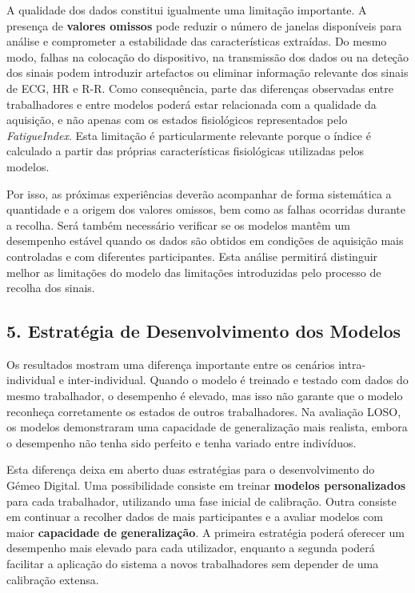 A qualidade dos dados constitui igualmente uma limitação importante. A presença de \textbf{valores omissos} pode reduzir o número de janelas disponíveis para análise e comprometer a estabilidade das características extraídas. Do mesmo modo, falhas na colocação do dispositivo, na transmissão dos dados ou na deteção dos sinais podem introduzir artefactos ou eliminar informação relevante dos sinais de ECG, HR e R-R. Como consequência, parte das diferenças observadas entre trabalhadores e entre modelos poderá estar relacionada com a qualidade da aquisição, e não apenas com os estados fisiológicos representados pelo \textit{FatigueIndex}. Esta limitação é particularmente relevante porque o índice é calculado a partir das próprias características fisiológicas utilizadas pelos modelos.

Por isso, as próximas experiências deverão acompanhar de forma sistemática a quantidade e a origem dos valores omissos, bem como as falhas ocorridas durante a recolha. Será também necessário verificar se os modelos mantêm um desempenho estável quando os dados são obtidos em condições de aquisição mais controladas e com diferentes participantes. Esta análise permitirá distinguir melhor as limitações do modelo das limitações introduzidas pelo processo de recolha dos sinais.

\subsection*{5. Estratégia de Desenvolvimento dos Modelos}

Os resultados mostram uma diferença importante entre os cenários intra-individual e inter-individual. Quando o modelo é treinado e testado com dados do mesmo trabalhador, o desempenho é elevado, mas isso não garante que o modelo reconheça corretamente os estados de outros trabalhadores. Na avaliação LOSO, os modelos demonstraram uma capacidade de generalização mais realista, embora o desempenho não tenha sido perfeito e tenha variado entre indivíduos.

Esta diferença deixa em aberto duas estratégias para o desenvolvimento do Gémeo Digital. Uma possibilidade consiste em treinar \textbf{modelos personalizados} para cada trabalhador, utilizando uma fase inicial de calibração. Outra consiste em continuar a recolher dados de mais participantes e a avaliar modelos com maior \textbf{capacidade de generalização}. A primeira estratégia poderá oferecer um desempenho mais elevado para cada utilizador, enquanto a segunda poderá facilitar a aplicação do sistema a novos trabalhadores sem depender de uma calibração extensa.

